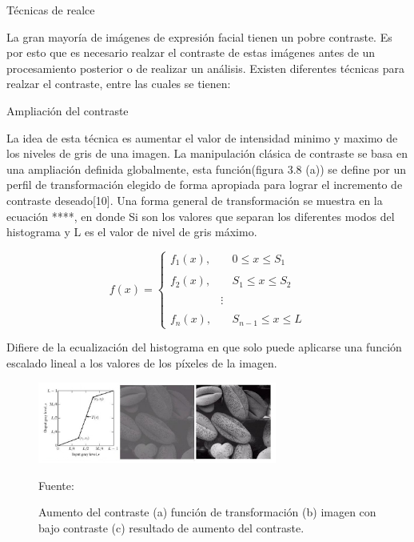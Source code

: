 \begin{enumerate}
{\bf\item[A. ] Técnicas de realce} \vskip 0.1cm
La gran mayoría de imágenes de expresión facial tienen un pobre contraste. Es por esto que es necesario realzar el contraste de estas imágenes antes de un procesamiento posterior o de realizar un análisis. Existen diferentes técnicas para realzar el contraste, entre las cuales se tienen:

\begin{itemize}
{\bf \item[•] Ampliación del contraste} \vskip 0.1cm
La idea de esta técnica es aumentar el valor de intensidad minimo y maximo de los niveles de gris de una imagen. La manipulación clásica de contraste se basa en una ampliación definida globalmente, esta función(figura 3.8 (a)) se define por un perfil de transformación elegido de forma apropiada para lograr el incremento de contraste deseado[10]. 
\vskip 0.1cm
Una forma general de transformación se muestra en la ecuación ****, en donde Si son los valores que separan los diferentes modos del histograma y L es el valor de nivel de gris máximo. 

\begin{equation}
f(x)= \left\{ \begin{array}{lcc}
             f_{1}(x), & & 0 \leqslant x \leqslant S_{1}  \\
             \\ f_{2}(x), & & S_{1} \leqslant x \leqslant S_{2} \\
             \\ & \vdots & \\
             \\ f_{n}(x), & & S_{n-1} \leqslant x \leqslant L 
             \end{array}
   \right.
\end{equation}

\vskip 0.1cm 
Difiere de la ecualización del histograma en que solo puede aplicarse una función escalado lineal a los valores de los píxeles de la imagen.

\begin{figure}[ht]
\begin{center}
\includegraphics[width=0.7\textwidth]{Imagen12}
\end{center}
\begin{center}
\vskip -0.5cm
\caption{\small{Aumento del contraste (a) función de transformación (b) imagen con bajo contraste (c) resultado de aumento del contraste.}}
{\small{Fuente: \cite{FALTA}}}
\end{center}
\end{figure}


\end{itemize}
\end{enumerate}
